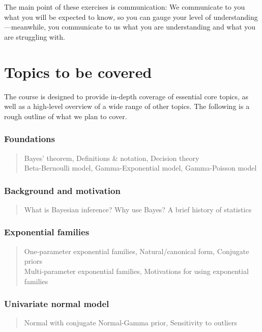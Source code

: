 \documentclass[12pt]{article}
\begin{document}
The main point of these exercises is communication: We communicate to you what you will be expected to know, so you can gauge your level of understanding---meanwhile, you communicate to us what you are understanding and what you are struggling with.




\section{Topics to be covered}

The course is designed to provide in-depth coverage of essential core topics, as well as a high-level overview of a wide range of other topics. The following is a rough outline of what we plan to cover.

\subsubsection*{Foundations}
\begin{quote}
Bayes' theorem, Definitions \& notation, Decision theory \\
Beta-Bernoulli model, Gamma-Exponential model, Gamma-Poisson model
\end{quote}

\subsubsection*{Background and motivation}
\begin{quote}
What is Bayesian inference? Why use Bayes? A brief history of statistics
\end{quote}

\subsubsection*{Exponential families}
\begin{quote}
One-parameter exponential families, Natural/canonical form, Conjugate priors \\
Multi-parameter exponential families, Motivations for using exponential families
\end{quote}

\subsubsection*{Univariate normal model}
\begin{quote}
Normal with conjugate Normal-Gamma prior, Sensitivity to outliers
\end{quote}
\end{document}
